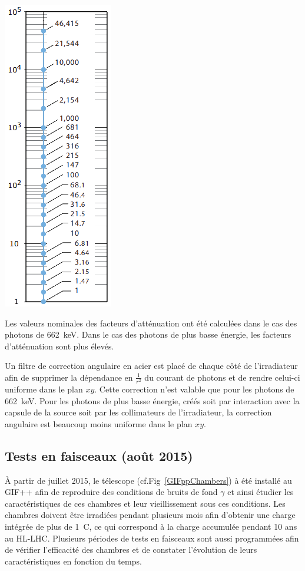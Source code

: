 \marginpar
{
	\centering
	\includegraphics[width=1.0\marginparwidth]{GLA/ValueAttenuateur.png}
	\label{ValueAttenuateur}
}

Les valeurs nominales des facteurs d'atténuation ont été calculées dans le cas des photons de \SI{662}{\kilo\eV}. Dans le cas des photons de plus basse énergie, les facteurs d'atténuation sont plus élevés. 

Un filtre de correction angulaire en acier est placé de chaque côté de l'irradiateur afin de supprimer la dépendance en $\frac{1}{r^2}$ du courant de photons et de rendre celui-ci uniforme dans le plan $xy$. Cette correction n'est valable que pour les photons de \SI{662}{\kilo\eV}. Pour les photons de plus basse énergie, créés soit par interaction avec la capsule de la source soit par les collimateurs de l'irradiateur, la correction angulaire est beaucoup moins uniforme dans le plan $xy$.

\subsection{Tests en faisceaux (août 2015)}
\label{GIFFF}
À partir de juillet \num{2015}, le télescope (cf.Fig~\ref{GIFppChambers}) à été installé au GIF++ afin de reproduire des conditions de bruits de fond $\gamma$ et ainsi étudier les caractéristiques de ces chambres et leur vieillissement sous ces conditions. Les chambres doivent être irradiées pendant plusieurs mois afin d'obtenir une charge intégrée de plus de \SI{1}{\coulomb}, ce qui correspond à la charge accumulée pendant \num{10} ans au HL-LHC.
Plusieurs périodes de tests en faisceaux sont aussi programmées afin de vérifier l'efficacité des chambres et de constater l'évolution de leurs caractéristiques en fonction du temps. %

